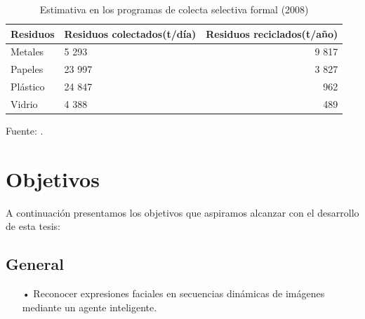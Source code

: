\begin{center}
\begin{table}[ht!]
\centering
\caption{Estimativa en los programas de colecta selectiva formal (2008)}
\begin{tabular}{llr} \toprule
Residuos & Residuos colectados(t/día) & Residuos reciclados(t/año) \\ \midrule
Metales & 5 293 & 9 817 \\
Papeles & 23 997 & 3 827 \\
Plástico & 24 847 & 962 \\
Vidrio & 4 388 & 489 \\ \bottomrule
\end{tabular}
\vskip 0.2cm
\begin{center}
{\small{Fuente: \cite{MMA}.}}
\end{center}
\end{table}
\end{center}
\vskip 0.5cm



\section{Objetivos}
A continuación presentamos los objetivos que aspiramos alcanzar con el desarrollo de esta tesis:

\subsection{General}
\begin{enumerate}
\item[•] Reconocer expresiones faciales en secuencias dinámicas de imágenes mediante un
agente inteligente.
\end{enumerate}
\vskip 0.3cm


